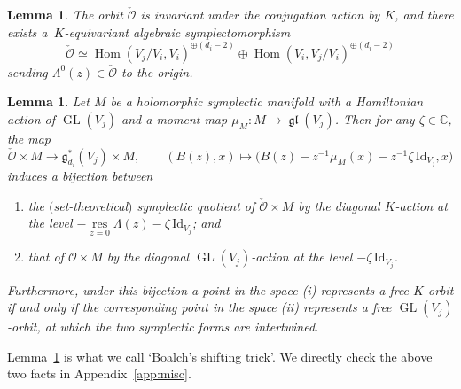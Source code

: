 \documentclass[pdftex]{sigma}
\newenvironment{enm}%
{\begin{enumerate}
\setlength{\itemsep}{0em}
}%
{\end{enumerate}}
\numberwithin{equation}{section}
\newtheorem{Lemma}[Theorem]{Lemma}
\theoremstyle{definition}
\newcommand{\lemref}[1]{Lemma~\ref{#1}}
\newcommand{\C}{\mathbb{C}} %
\newcommand{\GL}{\operatorname{GL}} %
\newcommand{\gl}{\operatorname{\mathfrak{gl}}}
\newcommand{\g}{\mathfrak{g}} %
\newcommand{\Hom}{\operatorname{Hom}}
\newcommand{\unit}{\mathrm{Id}}
\newcommand{\res}{\operatorname*{res}}
\newcommand{\bO}{\mathcal{O}}
\begin{document}
\begin{Lemma}\label{lem:boalch1}
The orbit $\check{\bO}$
is invariant under the conjugation action by $K$,
and there exists a~$K$-equivariant
algebraic symplectomorphism
\[
\check{\bO} \simeq
\Hom(V_j/V_i,V_i)^{\oplus (d_i-2)} \oplus \Hom(V_i,V_j/V_i)^{\oplus (d_i-2)}
\]
sending $\Lambda^0(z) \in \check{\bO}$ to the origin.
\end{Lemma}

\begin{Lemma}\label{lem:boalch2}
Let $M$ be a holomorphic symplectic manifold
with a Hamiltonian action of $\GL(V_j)$ and
a moment map $\mu_M \colon M \to \gl(V_j)$.
Then for any $\zeta \in \C$, the map
\[
\check{\bO} \times M \to \g^*_{d_i}(V_j) \times M, \qquad
(B(z), x) \mapsto \big(B(z)-z^{-1}\mu_M(x)-z^{-1}\zeta\,\unit_{V_j},x\big)
\]
induces a bijection between
\begin{enm}
\item the $($set-theoretical$)$ symplectic quotient of $\check{\bO} \times M$ by
the diagonal $K$-action at the level
$-\res\limits_{z=0}\Lambda(z)-\zeta\,\unit_{V_j}$; and
\item that of $\bO \times M$ by the diagonal $\GL(V_j)$-action
at the level $-\zeta\,\unit_{V_j}$.
\end{enm}
Furthermore, under this bijection
a point in the space {\rm (i)} represents a free $K$-orbit
if and only if the corresponding point in the space {\rm (ii)}
represents a free $\GL(V_j)$-orbit,
at which the two symplectic forms are intertwined.
\end{Lemma}

\lemref{lem:boalch2} is what we call `Boalch's shifting trick'.
We directly check the above two facts in Appendix~\ref{app:misc}.
\end{document}
